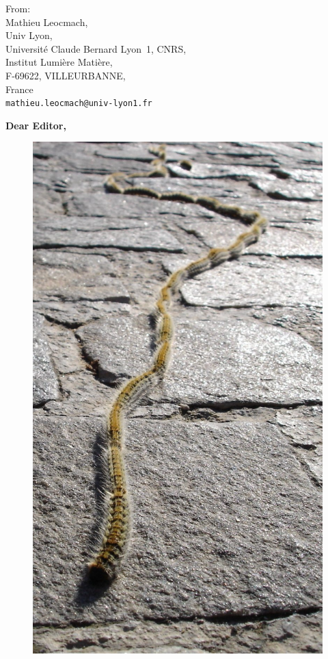 \documentclass[a4paper, parskip=true, firsthead=false, fromemail=true, foldmarks=false]{scrlttr2}
\begin{document}
\begin{letter}{From:\\
Mathieu Leocmach,\\
Univ Lyon,\\ 
Universit\'e Claude Bernard Lyon~1, CNRS,\\
Institut Lumi\`ere Mati\`ere,\\
F-69622, VILLEURBANNE,\\
France\\
\texttt{mathieu.leocmach@univ-lyon1.fr}
}
\opening{\bf Dear Editor,}

\begin{figure}
\hfill
\includegraphics[width=\linewidth]{presentation/Thaumetopea_pityocampa_01.jpg}


\end{figure}
\end{letter}
\end{document}
